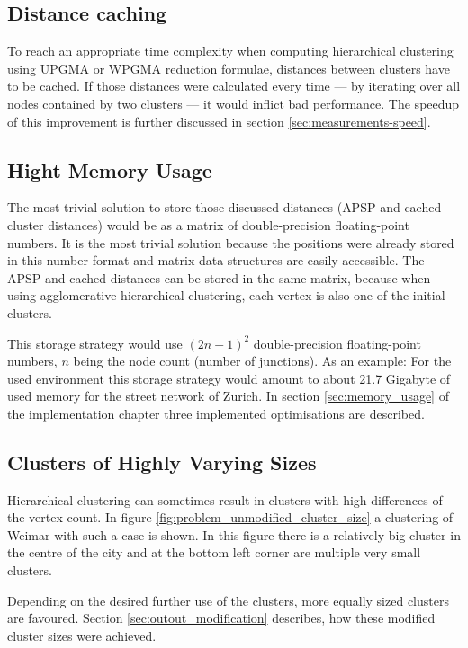 \subsection{Distance caching} \label{sec:concept_distance_caching}
To reach an appropriate time complexity when computing hierarchical clustering using \acrshort{UPGMA} or \acrshort{WPGMA} reduction formulae, distances between clusters have to be cached. If those distances were calculated every time --- by iterating over all nodes contained by two clusters --- it would inflict bad performance. The speedup of this improvement is further discussed in section \ref{sec:measurements-speed}.

\subsection{Hight Memory Usage} \label{sec:concept_memory_usage}
The most trivial solution to store those discussed distances (\acrshort{APSP} and cached cluster distances) would be as a matrix of double-precision floating-point numbers. It is the most trivial solution because the positions were already stored in this number format and matrix data structures are easily accessible. The \acrshort{APSP} and cached distances can be stored in the same matrix, because when using agglomerative hierarchical clustering, each vertex is also one of the initial clusters.

This storage strategy would use $(2n-1)^2$ double-precision floating-point numbers, $n$ being the node count (number of junctions). As an example: For the used environment this storage strategy would amount to about 21.7 Gigabyte of used memory for the street network of Zurich. In section \ref{sec:memory_usage} of the implementation chapter three implemented optimisations are described.

\subsection{Clusters of Highly Varying Sizes} \label{sec:concept_cluster_sizes}
Hierarchical clustering can sometimes result in clusters with high differences of the vertex count. In figure \ref{fig:problem_unmodified_cluster_size} a clustering of Weimar with such a case is shown. In this figure there is a relatively big cluster in the centre of the city and at the bottom left corner are multiple very small clusters.

Depending on the desired further use of the clusters, more equally sized clusters are favoured. Section \ref{sec:outout_modification} describes, how these modified cluster sizes were achieved.

